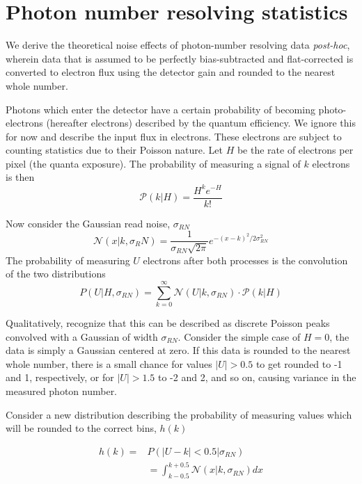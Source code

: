 \section{Photon number resolving statistics}\label{sec:pnr_derivation}

We derive the theoretical noise effects of photon-number resolving data \textit{post-hoc}, wherein data that is assumed to be perfectly bias-subtracted and flat-corrected is converted to electron flux using the detector gain and rounded to the nearest whole number.

Photons which enter the detector have a certain probability of becoming photo-electrons (hereafter electrons) described by the quantum efficiency. We ignore this for now and describe the input flux in electrons. These electrons are subject to counting statistics due to their Poisson nature. Let $H$ be the rate of electrons per pixel (the quanta exposure). The probability of measuring a signal of $k$ electrons is then
\begin{equation}
    \mathcal{P}\left(k | H\right) = \frac{H^k e^{-H}}{k!}
\end{equation}

Now consider the Gaussian read noise, $\sigma_{RN}$
\begin{equation}
    \mathcal{N}\left(x | k, \sigma_RN\right) = \frac{1}{\sigma_{RN}\sqrt{2\pi}}e^{-(x - k)^2 / 2\sigma_{RN}^2}
\end{equation}
The probability of measuring $U$ electrons after both processes is the convolution of the two distributions
\begin{equation}
    P(U | H, \sigma_{RN}) = \sum_{k=0}^\infty{\mathcal{N}\left(U | k, \sigma_{RN}\right)\cdot \mathcal{P}\left(k|H\right)}
\end{equation}

Qualitatively, recognize that this can be described as discrete Poisson peaks convolved with a Gaussian of width $\sigma_{RN}$. Consider the simple case of $H=0$, the data is simply a Gaussian centered at zero. If this data is rounded to the nearest whole number, there is a small chance for values $|U|>0.5$  to get rounded to -1 and 1, respectively, or for $|U| > 1.5$ to -2 and 2, and so on, causing variance in the measured photon number. 

Consider a new distribution describing the probability of measuring values which will be rounded to the correct bins, $h(k)$

\begin{align}
    h(k) = &P\left(|U - k| < 0.5 | \sigma_{RN}\right) \\
    &= \int_{k - 0.5}^{k + 0.5}{\mathcal{N}(x | k, \sigma_{RN}) dx}
\end{align}

